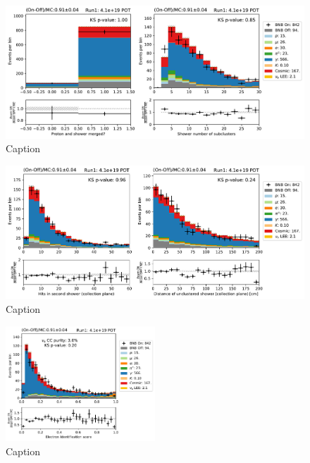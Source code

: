 \begin{figure}
    \centering
    \includegraphics[width=\textwidth]{NueCCsel/Images/run1/e_cand_subclusters.pdf}
    \caption{Caption}
    \label{fig:e_cand_subclusters}
\end{figure}

\begin{figure}
    \centering
    \includegraphics[width=\textwidth]{NueCCsel/Images/run1/e_cand_secondshower.pdf}
    \caption{Caption}
    \label{fig:e_cand_secondshower}
\end{figure}

\begin{figure}
    \centering
    \includegraphics[width=0.5\textwidth]{NueCCsel/Images/run1/pre_e_score.pdf}
    \caption{Caption}
    \label{fig:pre_shower_E_pdg}
\end{figure}


